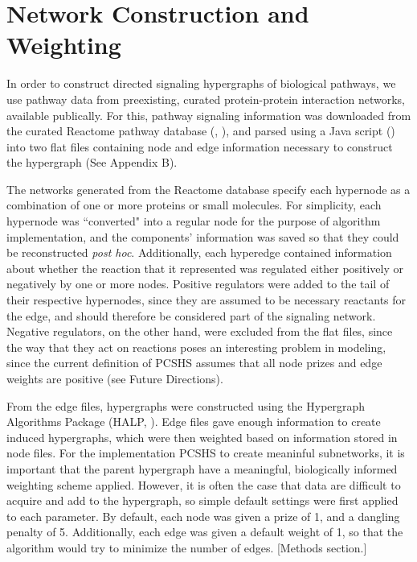 \documentclass[12pt,twoside]{reedthesis}
\newcommand{\new}[2]{{\color{purple}#1 [#2]}}
\theoremstyle{definition}
\begin{document}
  \section{Network Construction and Weighting}
  In order to construct directed signaling hypergraphs of biological pathways, we use pathway data from preexisting, curated protein-protein interaction networks, available publically. For this, pathway signaling information was downloaded from the curated Reactome pathway database (\cite{Croft2014}, \cite{Milacic2012}), and parsed using a Java script (\cite{AnnaCorrespondence}) into two flat files containing node and edge information necessary to construct the hypergraph (See Appendix B).\par
  The networks generated from the Reactome database specify each hypernode as a combination of one or more proteins or small molecules. For simplicity, each hypernode was ``converted" into a regular node for the purpose of algorithm implementation, and the components' information was saved so that they could be reconstructed \textit{post hoc}. Additionally, each hyperedge contained information about whether the reaction that it represented was regulated either positively or negatively by one or more nodes. Positive regulators were added to the tail of their respective hypernodes, since they are assumed to be necessary reactants for the edge, and should therefore be considered part of the signaling network. Negative regulators, on the other hand, were excluded from the flat files, since the way that they act on reactions poses an interesting problem in modeling, since the current definition of PCSHS assumes that all node prizes and edge weights are positive (see Future Directions).\par
  \new{From the edge files, hypergraphs were constructed using the Hypergraph Algorithms Package (HALP, \cite{halp}). Edge files gave enough information to create induced hypergraphs, which were then weighted based on information stored in node files. For the implementation PCSHS to create meaninful subnetworks, it is important that the parent hypergraph have a meaningful, biologically informed weighting scheme applied. However, it is often the case that data are difficult to acquire and add to the hypergraph, so simple default settings were first applied to each parameter. By default, each node was given a prize of 1, and a dangling penalty of 5.  Additionally, each edge was given a default weight of 1, so that the algorithm would try to minimize the number of edges.}{Methods section.}
\end{document}
